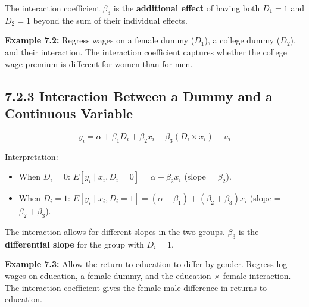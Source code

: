 The interaction coefficient $\beta_3$ is the \textbf{additional effect} of having both $D_1 = 1$ and $D_2 = 1$ beyond the sum of their individual effects.

\textbf{Example 7.2:} Regress wages on a female dummy ($D_1$), a college dummy ($D_2$), and their interaction. The interaction coefficient captures whether the college wage premium is different for women than for men.

\subsection{7.2.3 Interaction Between a Dummy and a Continuous Variable}

\[
y_i = \alpha + \beta_1 D_i + \beta_2 x_i + \beta_3 (D_i \times x_i) + u_i
\]

Interpretation:
\begin{itemize}
\item When $D_i = 0$: $E[y_i \mid x_i, D_i=0] = \alpha + \beta_2 x_i$ (slope = $\beta_2$).
\item When $D_i = 1$: $E[y_i \mid x_i, D_i=1] = (\alpha + \beta_1) + (\beta_2 + \beta_3) x_i$ (slope = $\beta_2 + \beta_3$).
\end{itemize}

The interaction allows for different slopes in the two groups. $\beta_3$ is the \textbf{differential slope} for the group with $D_i = 1$.

\textbf{Example 7.3:} Allow the return to education to differ by gender. Regress log wages on education, a female dummy, and the education $\times$ female interaction. The interaction coefficient gives the female-male difference in returns to education.

